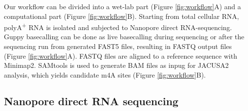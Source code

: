 \documentclass[times, 11pt, a4paper]{article}
\begin{document}
Our workflow can be divided into a wet-lab part (Figure \ref{fig:workflow}A) and a computational part (Figure \ref{fig:workflow}B). Starting from total cellular RNA, polyA\textsuperscript{+} RNA is isolated and subjected to Nanopore direct RNA-sequencing. Guppy basecalling can be done as live basecalling during sequencing or after the sequencing run from generated FAST5 files, resulting in FASTQ output files (Figure \ref{fig:workflow}A). FASTQ files are aligned to a reference sequence with Minimap2. SAMtools is used to generate BAM files as inpug for JACUSA2 analysis, which yields candidate m4A sites (Figure \ref{fig:workflow}B).


\subsection*{Nanopore direct RNA sequencing}
\end{document}
